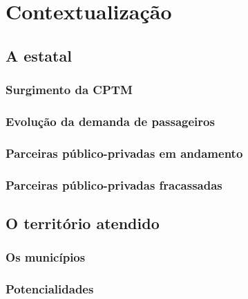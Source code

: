 \documentclass[11pt,fleqn]{book} %
\begin{document}

\part{Contextualização}

\chapter{A estatal}

\section{Surgimento da CPTM}

\lipsum[3-4]

\section{Evolução da demanda de passageiros}

\lipsum[3-4]

\section{Parceiras público-privadas em andamento}

\lipsum[3-4]

\section{Parceiras público-privadas fracassadas}

\lipsum[3-4]

\chapter{O território atendido}

\section{Os municípios}

\lipsum[3-4]

\section{Potencialidades}
\end{document}

